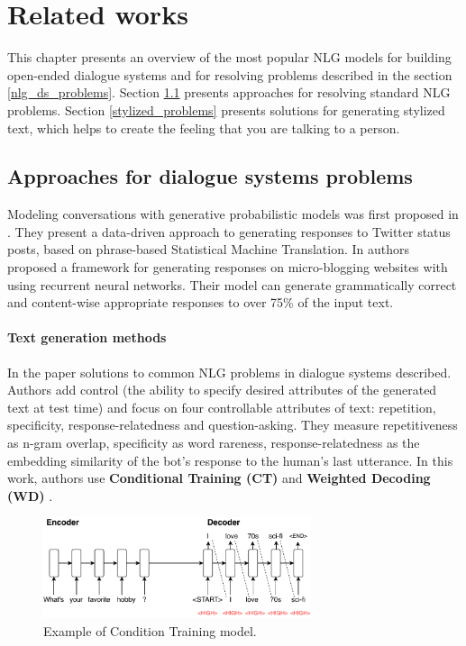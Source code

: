 \chapter{Related works}
This chapter presents an overview of the most popular NLG models for building open-ended dialogue systems and for resolving problems described in the section \ref{nlg_ds_problems}. Section \ref{usual_problems} presents approaches for resolving standard NLG problems. Section \ref{stylized_problems} presents solutions for generating stylized text, which helps to create the feeling that you are talking to a person.

\section{Approaches for dialogue systems problems}\label{usual_problems}
Modeling conversations with generative probabilistic models was first proposed in \cite{ritter2011data}. They present a data-driven approach to generating responses to Twitter status posts, based on
phrase-based Statistical Machine Translation. In \cite{shang2015neural} authors proposed a framework for generating responses on micro-blogging websites with using recurrent neural networks. Their model can generate grammatically correct and content-wise appropriate responses to over 75\% of the input text.

\subsubsection{Text generation methods}
In the paper \cite{see2019makes} solutions to common NLG problems in dialogue systems described. Authors add control (the ability to specify desired attributes of the generated text at test time) and focus on four controllable attributes of text: repetition, specificity, response-relatedness and question-asking. They measure repetitiveness as n-gram overlap, specificity as word rareness, response-relatedness as the embedding similarity of the bot’s response to the human’s last utterance. In this work, authors use \textbf{Conditional Training (CT)} \cite{peng2018towards} and \textbf{Weighted Decoding (WD)} \cite{ghazvininejad2017hafez}. 

\begin{figure}[hbt]
  \centering
  \includegraphics[width=0.7\textwidth]{figures/ct.pdf}
  \caption{Example of Condition Training model.}
  \label{ct}
\end{figure}



